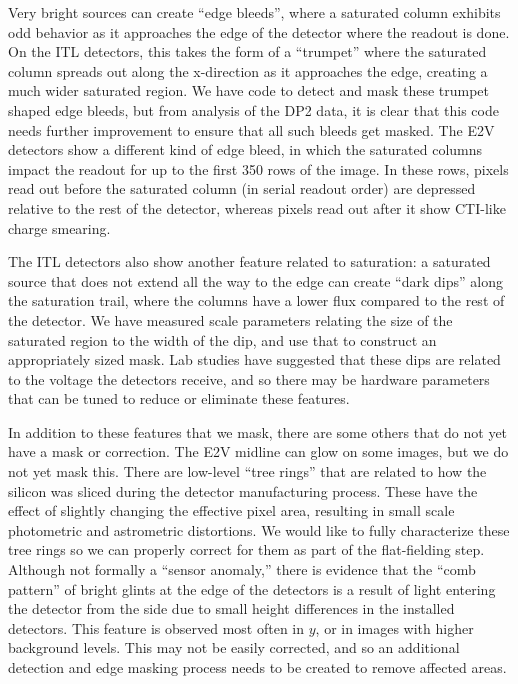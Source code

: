 Very bright sources can create ``edge bleeds'', where a saturated column exhibits odd behavior as it approaches the edge of the detector where the readout is done.
On the \gls{ITL} detectors, this takes the form of a ``trumpet'' where the saturated column spreads out along the x-direction as it approaches the edge, creating a much wider saturated region.
We have code to detect and mask these trumpet shaped edge bleeds, but from analysis of the \gls{DP2} data, it is clear that this code needs further improvement to ensure that all such bleeds get masked.
The \gls{E2V} detectors show a different kind of edge bleed, in which the saturated columns impact the readout for up to the first 350 rows of the image.
In these rows, pixels read out before the saturated column (in serial readout order) are depressed relative to the rest of the detector, whereas pixels read out after it show \gls{CTI}-like charge smearing.

The \gls{ITL} detectors also show another feature related to saturation: a saturated source that does not extend all the way to the edge can create ``dark dips'' along the saturation trail, where the columns have a lower flux compared to the rest of the detector.
We have measured scale parameters relating the size of the saturated region to the width of the dip, and use that to construct an appropriately sized mask.
Lab studies have suggested that these dips are related to the voltage the detectors receive, and so there may be hardware parameters that can be tuned to reduce or eliminate these features.

In addition to these features that we mask, there are some others that do not yet have a mask or correction.
The \gls{E2V} midline can glow on some images, but we do not yet mask this.
There are low-level ``tree rings'' that are related to how the silicon was sliced during the detector manufacturing process.
These have the effect of slightly changing the effective pixel area, resulting in small scale photometric and astrometric distortions.
We would like to fully characterize these tree rings so we can properly correct for them as part of the flat-fielding step.
Although not formally a ``sensor anomaly,'' there is evidence that the ``comb pattern'' of bright glints at the edge of the detectors is a result of light entering the detector from the side due to small height differences in the installed detectors.
This feature is observed most often in $y$, or in images with higher \gls{background} levels.
This may not be easily corrected, and so an additional detection and edge masking process needs to be created to remove affected areas.

